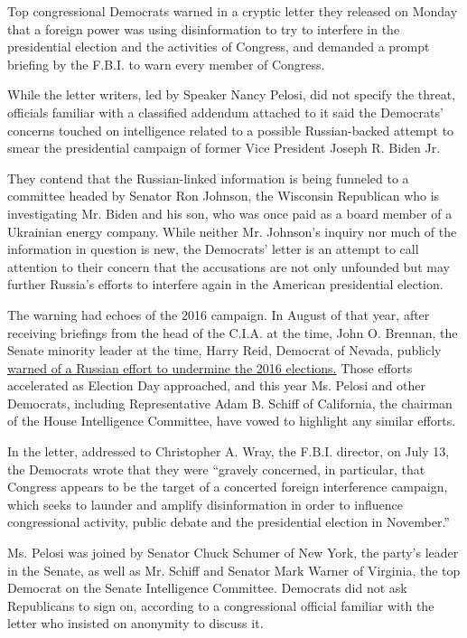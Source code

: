Top congressional Democrats warned in a cryptic letter they released on
Monday that a foreign power was using disinformation to try to interfere
in the presidential election and the activities of Congress, and
demanded a prompt briefing by the F.B.I. to warn every member of
Congress.

While the letter writers, led by Speaker Nancy Pelosi, did not specify
the threat, officials familiar with a classified addendum attached to it
said the Democrats' concerns touched on intelligence related to a
possible Russian-backed attempt to smear the presidential campaign of
former Vice President Joseph R. Biden Jr.

They contend that the Russian-linked information is being funneled to a
committee headed by Senator Ron Johnson, the Wisconsin Republican who is
investigating Mr. Biden and his son, who was once paid as a board member
of a Ukrainian energy company. While neither Mr. Johnson's inquiry nor
much of the information in question is new, the Democrats' letter is an
attempt to call attention to their concern that the accusations are not
only unfounded but may further Russia's efforts to interfere again in
the American presidential election.

The warning had echoes of the 2016 campaign. In August of that year,
after receiving briefings from the head of the C.I.A. at the time, John
O. Brennan, the Senate minority leader at the time, Harry Reid, Democrat
of Nevada, publicly
\href{https://www.nytimes.com/2016/08/30/us/politics/harry-reid-russia-tampering-election-fbi.html}{warned
of a Russian effort to undermine the 2016 elections.} Those efforts
accelerated as Election Day approached, and this year Ms. Pelosi and
other Democrats, including Representative Adam B. Schiff of California,
the chairman of the House Intelligence Committee, have vowed to
highlight any similar efforts.

In the letter, addressed to Christopher A. Wray, the F.B.I. director, on
July 13, the Democrats wrote that they were ``gravely concerned, in
particular, that Congress appears to be the target of a concerted
foreign interference campaign, which seeks to launder and amplify
disinformation in order to influence congressional activity, public
debate and the presidential election in November.''

Ms. Pelosi was joined by Senator Chuck Schumer of New York, the party's
leader in the Senate, as well as Mr. Schiff and Senator Mark Warner of
Virginia, the top Democrat on the Senate Intelligence Committee.
Democrats did not ask Republicans to sign on, according to a
congressional official familiar with the letter who insisted on
anonymity to discuss it.

